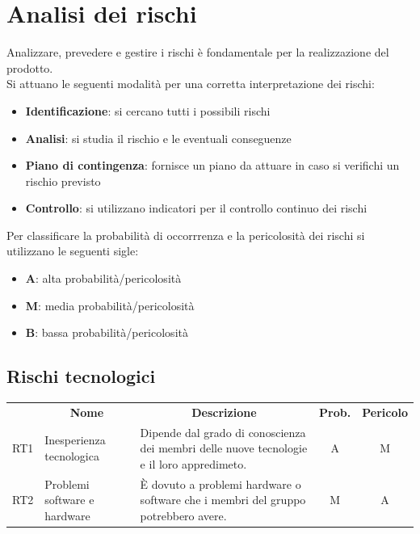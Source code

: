 \section{Analisi dei rischi}
Analizzare, prevedere e gestire i rischi è fondamentale per la realizzazione del prodotto. \\
Si attuano le seguenti modalità per una corretta interpretazione dei rischi:
\begin{itemize}
    \item \textbf{Identificazione}: si cercano tutti i possibili rischi
    \item \textbf{Analisi}: si studia il rischio e le eventuali conseguenze
    \item \textbf{Piano di contingenza}: fornisce un piano da attuare in caso si verifichi un rischio previsto
    \item \textbf{Controllo}: si utilizzano indicatori per il controllo continuo dei rischi
\end{itemize}
\noindent
Per classificare la probabilità di occorrrenza e la pericolosità dei rischi si utilizzano le seguenti sigle:
\begin{itemize}
    \item \textbf{A}: alta probabilità/pericolosità
    \item \textbf{M}:  media probabilità/pericolosità
    \item \textbf{B}:  bassa probabilità/pericolosità
\end{itemize}

\subsection{Rischi tecnologici}
\begin{table}[H]
\centering
\renewcommand{\arraystretch}{1.8}
    \begin{tabular}{c | p{4.2cm} | p{5cm} |c |  c  }
		\rowcolor[HTML]{a52a2a}
        \multicolumn{1}{c}{\color[HTML]{FFFFFF} \textbf{Codice}} &
        \multicolumn{1}{c}{\color[HTML]{FFFFFF} \textbf{Nome}} &
        \multicolumn{1}{c}{\color[HTML]{FFFFFF} \textbf{Descrizione}} &
        \multicolumn{1}{c}{\color[HTML]{FFFFFF} \textbf{Prob.}} &
        \multicolumn{1}{c}{\color[HTML]{FFFFFF} \textbf{Pericolo}}\\
	RT1 &  Inesperienza tecnologica & Dipende dal grado di conoscienza dei membri delle nuove tecnologie e il loro appredimeto. & A & M \\
    RT2 & Problemi software e hardware & È dovuto a problemi hardware o software che i membri del gruppo potrebbero avere. & M & A \\
    \end{tabular}
	
\end{table}

